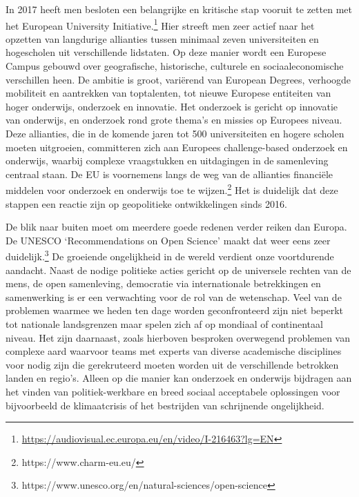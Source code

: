 \documentclass[empirical, authordate, ]{new-jote-article}
\begin{document}
	In 2017 heeft men besloten een belangrijke en kritische stap vooruit te zetten met het European University Initiative.\footnote{\href{https://audiovisual.ec.europa.eu/en/video/I-216463?lg=EN}{https://audiovisual.ec.europa.eu/en/video/I-216463?lg=EN} } Hier streeft men zeer actief naar het opzetten van langdurige allianties tussen minimaal zeven universiteiten en hogescholen uit verschillende lidstaten. Op deze manier wordt een Europese Campus gebouwd over geografische, historische, culturele en sociaaleconomische verschillen heen. De ambitie is groot, variërend van European Degrees, verhoogde mobiliteit en aantrekken van toptalenten, tot nieuwe Europese entiteiten van hoger onderwijs, onderzoek en innovatie. Het onderzoek is gericht op innovatie van onderwijs, en onderzoek rond grote thema's en missies op Europees niveau. Deze allianties, die in de komende jaren tot 500 universiteiten en hogere scholen moeten uitgroeien, committeren zich aan Europees challenge-based onderzoek en onderwijs, waarbij complexe vraagstukken en uitdagingen in de samenleving centraal staan. De EU is voornemens langs de weg van de allianties financiële middelen voor onderzoek en onderwijs toe te wijzen.\footnote{https://www.charm-eu.eu/} Het is duidelijk dat deze stappen een reactie zijn op geopolitieke ontwikkelingen sinds 2016.



	De blik naar buiten moet om meerdere goede redenen verder reiken dan Europa. De UNESCO ‘Recommendations on Open Science' maakt dat weer eens zeer duidelijk.\footnote{https://www.unesco.org/en/natural-sciences/open-science} De groeiende ongelijkheid in de wereld verdient onze voortdurende aandacht. Naast de nodige politieke acties gericht op de universele rechten van de mens, de open samenleving, democratie via internationale betrekkingen en samenwerking is er een verwachting voor de rol van de wetenschap. Veel van de problemen waarmee we heden ten dage worden geconfronteerd zijn niet beperkt tot nationale landsgrenzen maar spelen zich af op mondiaal of continentaal niveau. Het zijn daarnaast, zoals hierboven besproken overwegend problemen van complexe aard waarvoor teams met experts van diverse academische disciplines voor nodig zijn die gerekruteerd moeten worden uit de verschillende betrokken landen en regio's. Alleen op die manier kan onderzoek en onderwijs bijdragen aan het vinden van politiek-werkbare en breed sociaal acceptabele oplossingen voor bijvoorbeeld de klimaatcrisis of het bestrijden van schrijnende ongelijkheid.
\end{document}
